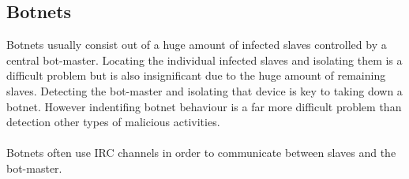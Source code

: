\subsection{Botnets}
Botnets usually consist out of a huge amount of infected slaves controlled by a central bot-master. Locating the individual infected slaves and isolating them is a difficult problem but is also insignificant due to the huge amount of remaining slaves. Detecting the bot-master and isolating that device is key to taking down a botnet. However indentifing botnet behaviour is a far more difficult problem than detection other types of malicious activities. \cite{zhu2008botnet}\\
\\
Botnets often use IRC channels in order to communicate between slaves and the bot-master. 


